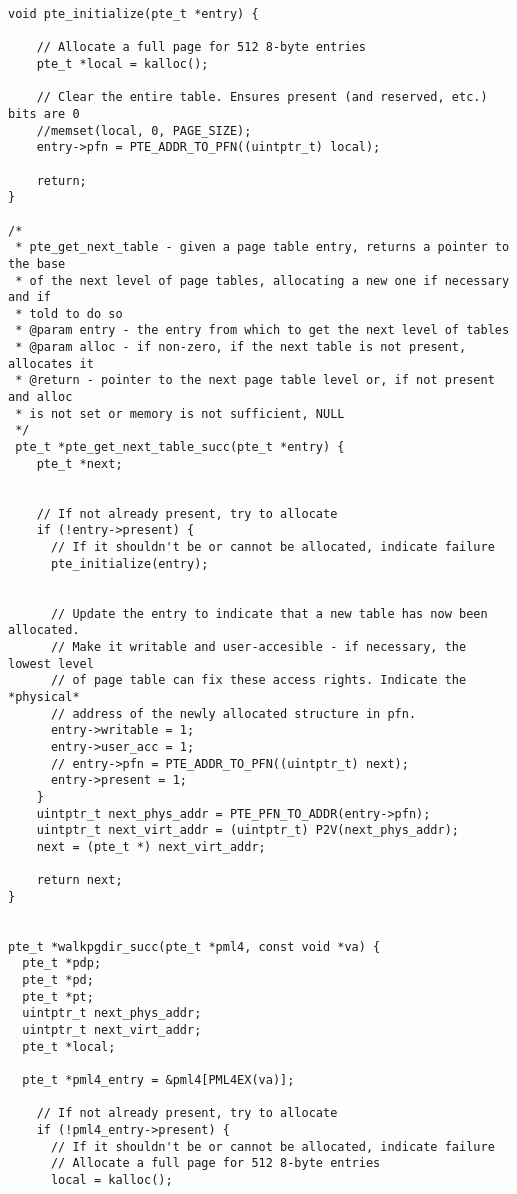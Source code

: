 \begin{lstlisting}[caption={Page-Table-Entry Library for Page-Table Traversal},label={cpagetablewalk},style=CStyle]
void pte_initialize(pte_t *entry) {
   
    // Allocate a full page for 512 8-byte entries
    pte_t *local = kalloc();
   
    // Clear the entire table. Ensures present (and reserved, etc.) bits are 0
    //memset(local, 0, PAGE_SIZE);
    entry->pfn = PTE_ADDR_TO_PFN((uintptr_t) local);

    return;
}

/*
 * pte_get_next_table - given a page table entry, returns a pointer to the base
 * of the next level of page tables, allocating a new one if necessary and if
 * told to do so
 * @param entry - the entry from which to get the next level of tables
 * @param alloc - if non-zero, if the next table is not present, allocates it
 * @return - pointer to the next page table level or, if not present and alloc
 * is not set or memory is not sufficient, NULL
 */
 pte_t *pte_get_next_table_succ(pte_t *entry) {
    pte_t *next;
   
    
    // If not already present, try to allocate
    if (!entry->present) {
      // If it shouldn't be or cannot be allocated, indicate failure
      pte_initialize(entry);
     

      // Update the entry to indicate that a new table has now been allocated.
      // Make it writable and user-accesible - if necessary, the lowest level
      // of page table can fix these access rights. Indicate the *physical*
      // address of the newly allocated structure in pfn.
      entry->writable = 1;
      entry->user_acc = 1;
      // entry->pfn = PTE_ADDR_TO_PFN((uintptr_t) next);
      entry->present = 1;
    }
    uintptr_t next_phys_addr = PTE_PFN_TO_ADDR(entry->pfn);
    uintptr_t next_virt_addr = (uintptr_t) P2V(next_phys_addr);
    next = (pte_t *) next_virt_addr;

    return next;
}


pte_t *walkpgdir_succ(pte_t *pml4, const void *va) {
  pte_t *pdp;
  pte_t *pd;
  pte_t *pt;
  uintptr_t next_phys_addr;
  uintptr_t next_virt_addr;  
  pte_t *local;
   
  pte_t *pml4_entry = &pml4[PML4EX(va)];
    
    // If not already present, try to allocate
    if (!pml4_entry->present) {
      // If it shouldn't be or cannot be allocated, indicate failure
      // Allocate a full page for 512 8-byte entries
      local = kalloc();
   

\end{lstlisting}
